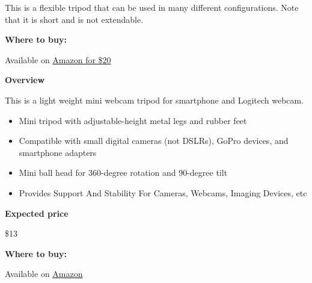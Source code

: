 \begin{gram}

This is a flexible tripod that can be used in many different
configurations.  Note that it is short and is not extendable. 


\textbf{Where to buy:}

Available on 
\href{
https://www.amazon.com/gp/product/B07837W5NX/ref=ppx_yo_dt_b_search_asin_title?ie=UTF8&psc=1}
{Amazon for \$20}
\end{gram}

\begin{gram}
\label{grm:tas::tripod::mamawin::main}

\textbf{Overview}

This is a light weight mini webcam tripod for smartphone and Logitech webcam.

%
\begin{itemize}
\item
Mini tripod with adjustable-height metal legs and rubber feet

\item
Compatible with small digital cameras (not DSLRs), GoPro devices, and smartphone adapters 

\item
Mini ball head for 360-degree rotation and 90-degree tilt

\item
Provides Support And Stability For Cameras, Webcams, Imaging Devices, etc

\end{itemize}



\textbf{Expected price}

\$13

\textbf{Where to buy:}

Available on
\href{https://www.amazon.com/Lightweight-Webcam-Tripod-Logitech-Camera/dp/B076SHC6RN/ref=sr_1_1_sspa?crid=2T6CQ3HNRR1XR&keywords=logitech+c920&qid=1582900721&s=electronics&sprefix=logitech+c,electronics,172&sr=1-1-spons&psc=1&spLa=ZW5jcnlwdGVkUXVhbGlmaWVyPUE1VjVUUFpKTU83QUkmZW5jcnlwdGVkSWQ9QTA1NTk1OTVLT1IyTzdRRFVEWkImZW5jcnlwdGVkQWRJZD1BMDEyNzk2NzEyTDVSOEdSQ1QxTEgmd2lkZ2V0TmFtZT1zcF9hdGYmYWN0aW9uPWNsaWNrUmVkaXJlY3QmZG9Ob3RMb2dDbGljaz10cnVl}{Amazon}

\end{gram}

